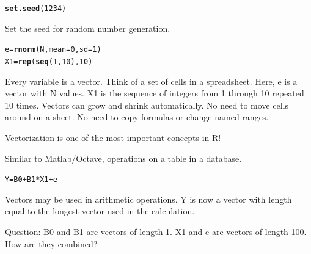 \documentclass[xcolor=dvipsnames]{beamer}
\makeatletter
\newcommand{\hlnum}[1]{\textcolor[rgb]{0.686,0.059,0.569}{#1}}%
\newcommand{\hlopt}[1]{\textcolor[rgb]{0,0,0}{#1}}%
\newcommand{\hlstd}[1]{\textcolor[rgb]{0.345,0.345,0.345}{#1}}%
\newcommand{\hlkwb}[1]{\textcolor[rgb]{0.69,0.353,0.396}{#1}}%
\newcommand{\hlkwc}[1]{\textcolor[rgb]{0.333,0.667,0.333}{#1}}%
\newcommand{\hlkwd}[1]{\textcolor[rgb]{0.737,0.353,0.396}{\textbf{#1}}}%
\newenvironment{kframe}{%
 \def\at@end@of@kframe{}%
 \ifinner\ifhmode%
  \def\at@end@of@kframe{\end{minipage}}%
  \begin{minipage}{\columnwidth}%
 \fi\fi%
 \def\FrameCommand##1{\hskip\@totalleftmargin \hskip-\fboxsep
 \colorbox{shadecolor}{##1}\hskip-\fboxsep
     \hskip-\linewidth \hskip-\@totalleftmargin \hskip\columnwidth}%
 \MakeFramed {\advance\hsize-\width
   \@totalleftmargin\z@ \linewidth\hsize
   \@setminipage}}%
 {\par\unskip\endMakeFramed%
 \at@end@of@kframe}
\newenvironment{knitrout}{}{} %
\makeatother
\begin{document}
\begin{frame}[fragile]
\begin{knitrout}
\color{fgcolor}\begin{kframe}
\begin{alltt}
\hlkwd{set.seed}\hlstd{(}\hlnum{1234}\hlstd{)}
\end{alltt}
\end{kframe}
\end{knitrout}

Set the seed for random number generation.
\end{frame}

\begin{frame}[fragile]
\begin{knitrout}
\color{fgcolor}\begin{kframe}
\begin{alltt}
\hlstd{e} \hlkwb{=} \hlkwd{rnorm}\hlstd{(N,} \hlkwc{mean} \hlstd{=} \hlnum{0}\hlstd{,} \hlkwc{sd} \hlstd{=} \hlnum{1}\hlstd{)}
\hlstd{X1} \hlkwb{=} \hlkwd{rep}\hlstd{(}\hlkwd{seq}\hlstd{(}\hlnum{1}\hlstd{,} \hlnum{10}\hlstd{),} \hlnum{10}\hlstd{)}
\end{alltt}
\end{kframe}
\end{knitrout}


Every variable is a vector. Think of a set of cells in a spreadsheet. Here, e is a vector with N values. X1 is the sequence of integers from 1 through 10 repeated 10 times. Vectors can grow and shrink automatically. No need to move cells around on a sheet. No need to copy formulas or change named ranges.
\end{frame}

\begin{frame}[fragile]
Vectorization is one of the most important concepts in R!

Similar to Matlab/Octave, operations on a table in a database.
\begin{knitrout}
\color{fgcolor}\begin{kframe}
\begin{alltt}
\hlstd{Y} \hlkwb{=} \hlstd{B0} \hlopt{+} \hlstd{B1} \hlopt{*} \hlstd{X1} \hlopt{+} \hlstd{e}
\end{alltt}
\end{kframe}
\end{knitrout}

Vectors may be used in arithmetic operations. Y is now a vector with length equal to the longest vector used in the calculation.

Question: B0 and B1 are vectors of length 1. X1 and e are vectors of length 100. How are they combined?
\end{frame}
\end{document}
